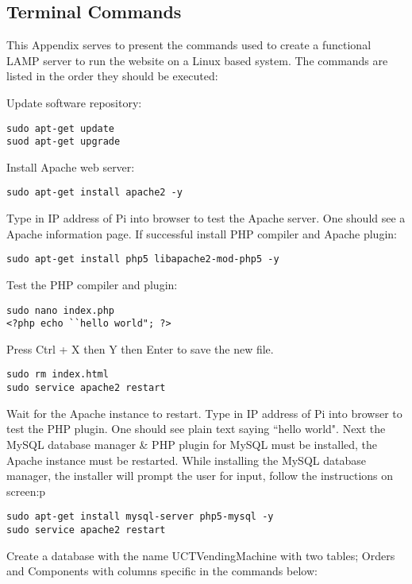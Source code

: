 \documentclass[a4paper,11pt]{article}
\numberwithin{figure}{section}
\numberwithin{table}{section}
\begin{document}
\begin{appendices}
\newpage


\section{Terminal Commands}\thispagestyle{sectionstart}
\label{sec:PiCommands}

This Appendix serves to present the commands used to create a functional LAMP server to run the website on a Linux based system. The commands are listed in the order they should be executed:

Update software repository:
\begin{lstlisting}
sudo apt-get update
suod apt-get upgrade
\end{lstlisting}
Install Apache web server:
\begin{lstlisting}[firstnumber=3]
sudo apt-get install apache2 -y
\end{lstlisting}
Type in IP address of Pi into browser to test the Apache server. One should see a Apache information page. If successful install PHP compiler and Apache plugin:
\begin{lstlisting}[firstnumber=4]
sudo apt-get install php5 libapache2-mod-php5 -y
\end{lstlisting}
Test the PHP compiler and plugin:
\begin{lstlisting}[firstnumber=5]
sudo nano index.php
<?php echo ``hello world"; ?>
\end{lstlisting}
Press Ctrl + X then Y then Enter to save the new file.
\begin{lstlisting}[firstnumber=7]
sudo rm index.html
sudo service apache2 restart
\end{lstlisting}
Wait for the Apache instance to restart. Type in IP address of Pi into browser to test the PHP plugin. One should see plain text saying ``hello world". Next the MySQL database manager \& PHP plugin for MySQL must be installed, the Apache instance must be restarted. While installing the MySQL database manager, the installer will prompt the user for input, follow the instructions on screen:p
\begin{lstlisting}[firstnumber=9]
sudo apt-get install mysql-server php5-mysql -y
sudo service apache2 restart
\end{lstlisting}
Create a database with the name UCTVendingMachine with two tables; Orders and Components with columns specific in the commands below:

\end{appendices}
\end{document}
